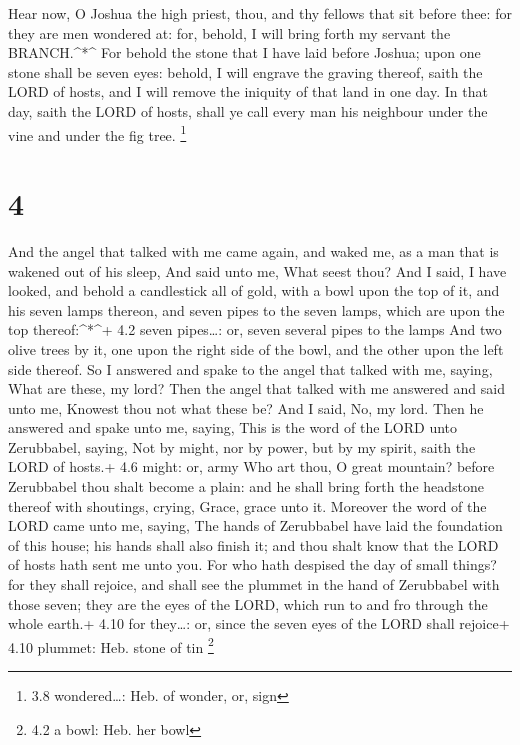  Hear now, O Joshua the high priest, thou, and thy fellows
that sit before thee: for they are men wondered at: for, behold, I will
bring forth my servant the BRANCH.\^{}*\^{}  For behold the
stone that I have laid before Joshua; upon one stone shall be seven
eyes: behold, I will engrave the graving thereof, saith the LORD of
hosts, and I will remove the iniquity of that land in one day.
 In that day, saith the LORD of hosts, shall ye call every
man his neighbour under the vine and under the fig tree. \footnote{3.8
  wondered\ldots: Heb. of wonder, or, sign}

\hypertarget{section-3}{%
\section{4}\label{section-3}}

 And the angel that talked with me came again, and waked me,
as a man that is wakened out of his sleep,  And said unto
me, What seest thou? And I said, I have looked, and behold a candlestick
all of gold, with a bowl upon the top of it, and his seven lamps
thereon, and seven pipes to the seven lamps, which are upon the top
thereof:\^{}*\^{}+ 4.2 seven pipes\ldots: or, seven several pipes to the
lamps  And two olive trees by it, one upon the right side of
the bowl, and the other upon the left side thereof.  So I
answered and spake to the angel that talked with me, saying, What are
these, my lord?  Then the angel that talked with me answered
and said unto me, Knowest thou not what these be? And I said, No, my
lord.  Then he answered and spake unto me, saying, This is
the word of the LORD unto Zerubbabel, saying, Not by might, nor by
power, but by my spirit, saith the LORD of hosts.+ 4.6 might: or, army
 Who art thou, O great mountain? before Zerubbabel thou
shalt become a plain: and he shall bring forth the headstone thereof
with shoutings, crying, Grace, grace unto it.  Moreover the
word of the LORD came unto me, saying,  The hands of
Zerubbabel have laid the foundation of this house; his hands shall also
finish it; and thou shalt know that the LORD of hosts hath sent me unto
you.  For who hath despised the day of small things? for
they shall rejoice, and shall see the plummet in the hand of Zerubbabel
with those seven; they are the eyes of the LORD, which run to and fro
through the whole earth.+ 4.10 for they\ldots: or, since the seven eyes
of the LORD shall rejoice+ 4.10 plummet: Heb. stone of tin \footnote{4.2
  a bowl: Heb. her bowl}

